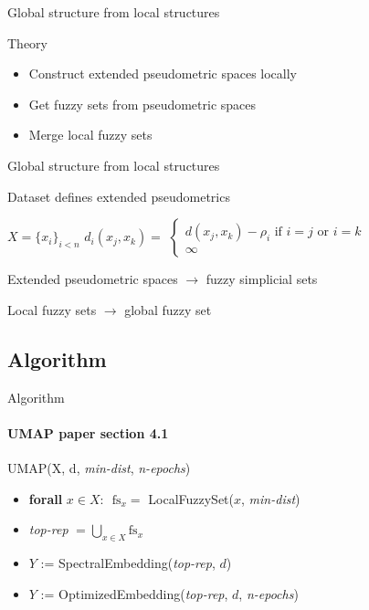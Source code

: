 \documentclass[unknownkeysallowed]{beamer}
\begin{document}
\begin{frame}{Global structure from local structures}

	\begin{block}{Theory}

	\begin{itemize}
		\item Construct extended pseudometric spaces locally
		\item Get fuzzy sets from pseudometric spaces
		\item Merge local fuzzy sets
	\end{itemize}

	\end{block}

\end{frame}

\begin{frame}{Global structure from local structures}

    \begin{block}{Dataset defines extended pseudometrics}

    $X = \{x_i\}_{i < n}$
    \break
    $d_i(x_j, x_k) = $
    $
    \begin{cases*}
        d(x_j, x_k) - \rho_i \textrm{ if } i = j \textrm{ or } i = k \\
        \infty
    \end{cases*}
    $
    \end{block}

    \begin{block}{Extended pseudometric spaces $\to$ fuzzy simplicial sets}

    \end{block}

    \begin{block}{Local fuzzy sets $\to$ global fuzzy set}

    \end{block}


\end{frame}

\subsection{Algorithm}

\begin{frame}{Algorithm}
\framesubtitle{UMAP paper section 4.1}


    \begin{block}{UMAP(X, d, \textit{min-dist}, \textit{n-epochs})}
    \begin{itemize}
        \item \textbf{forall} $x \in X$: $\textrm{ fs}_x =$ LocalFuzzySet($x$, \textit{min-dist})
        \item \textit{top-rep} $= \bigcup_{x \in X} \textrm{fs}_x$
        \item $Y$ := SpectralEmbedding(\textit{top-rep}, $d$)
        \item $Y$ := OptimizedEmbedding(\textit{top-rep}, $d$, \textit{n-epochs})
    \end{itemize}
    \end{block}
\end{frame}
\end{document}
